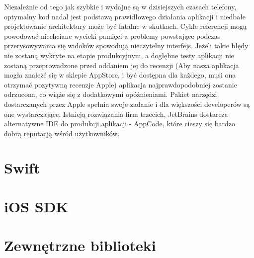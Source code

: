 Niezależnie od tego jak szybkie i wydajne są w dzisiejszych czasach telefony, optymalny kod nadal jest podstawą prawidłowego działania
aplikacji i niedbałe projektowanie architektury może być fatalne w skutkach. Cykle referencji mogą powodować niechciane wycieki pamięci
a problemy powstające podczas przerysowywania się widoków spowodują nieczytelny interfejs. Jeżeli takie błędy nie zostaną wykryte na
etapie produkcyjnym, a dogłębne testy aplikacji nie zostaną przeprowadzone przed oddaniem jej do recenzji (Aby nasza aplikacja mogła
znależć się w sklepie AppStore, i być dostępna dla każdego, musi ona otrzymać pozytywną recenzje Apple) aplikacja najprawdopodobniej
zostanie odrzucona, co wiąże się z dodatkowymi opóźnieniami. Pakiet narzędzi dostarczanych przez Apple spełnia swoje zadanie i dla
większości developerów są one wystarczające. Istnieją rozwiązania firm trzecich, JetBrains dostarcza alternatywne IDE do produkcji
aplikacji - AppCode, które cieszy się bardzo dobrą reputacją wśród użytkowników.

\section{Swift}

\section{iOS SDK}

\section{Zewnętrzne biblioteki}
